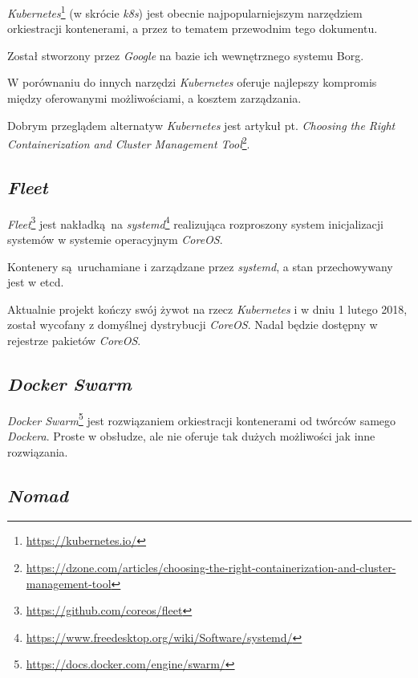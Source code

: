 \documentclass[a4paper,12pt,twoside,openany]{report}
\DeclareRobustCommand{\href}[2]{#2\footnote{\url{#1}}}
\begin{document}
\href{https://kubernetes.io/}{\emph{Kubernetes}} (w skrócie \emph{k8s})
jest obecnie najpopularniejszym narzędziem orkiestracji kontenerami, a
przez to tematem przewodnim tego dokumentu.

Został stworzony przez \emph{Google} na bazie ich wewnętrznego systemu
Borg.

W porównaniu do innych narzędzi \emph{Kubernetes} oferuje najlepszy
kompromis między oferowanymi możliwościami, a kosztem zarządzania.

Dobrym przeglądem alternatyw \emph{Kubernetes} jest artykuł pt.
\href{https://dzone.com/articles/choosing-the-right-containerization-and-cluster-management-tool}{\emph{Choosing
the Right Containerization and Cluster Management Tool}}.

\hypertarget{fleet}{%
\subsection{\texorpdfstring{\emph{Fleet}}{Fleet}}\label{fleet}}

\href{https://github.com/coreos/fleet}{\emph{Fleet}} jest nakładką~na
\href{https://www.freedesktop.org/wiki/Software/systemd/}{\emph{systemd}}
realizująca rozproszony system inicjalizacji systemów w systemie
operacyjnym \emph{CoreOS}.

Kontenery są~uruchamiane i zarządzane przez \emph{systemd}, a stan
przechowywany jest w etcd.

Aktualnie projekt kończy swój żywot na rzecz \emph{Kubernetes} i w dniu
1 lutego 2018, został wycofany z domyślnej dystrybucji \emph{CoreOS}.
Nadal będzie dostępny w rejestrze pakietów \emph{CoreOS}.

\hypertarget{docker-swarm}{%
\subsection{\texorpdfstring{\emph{Docker
Swarm}}{Docker Swarm}}\label{docker-swarm}}

\href{https://docs.docker.com/engine/swarm/}{\emph{Docker Swarm}} jest
rozwiązaniem orkiestracji kontenerami od twórców samego \emph{Dockera}.
Proste w obsłudze, ale nie oferuje tak dużych możliwości jak inne
rozwiązania.

\hypertarget{nomad}{%
\subsection{\texorpdfstring{\emph{Nomad}}{Nomad}}\label{nomad}}
\end{document}
